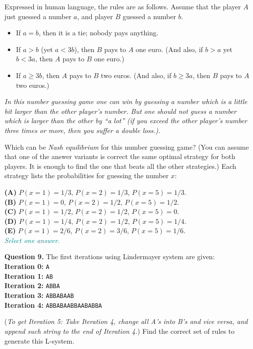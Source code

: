 \documentclass[jou]{apa6}
\begin{document}
Expressed in human language, the rules are as follows. 
Assume that the player $A$ just guessed a number $a$, and player $B$ guessed 
a number $b$. 
\begin{itemize}
\item If $a=b$, then it is a tie; nobody pays anything.
\item If $a>b$ (yet $a < 3b$), then $B$ pays to $A$ one euro. (And also, 
if $b>a$ yet $b < 3a$, then $A$ pays to $B$ one euro.)
\item If $a \geq 3b$, then $A$ pays to $B$ two euros. (And also, if $b \geq 3a$, 
then $B$ pays to $A$ two euros.)
\end{itemize}

{\em In this number guessing game one can win by guessing a number which is a little
bit larger than the other player's number. But one should not guess a number which is 
larger than the other by ``a lot'' (if you exceed the other player's number
three times or more, then you suffer a double loss.).}

Which can be {\em Nash equilibrium} for this number guessing game?
(You can assume that one of the answer variants is correct \textendash{} 
the same optimal strategy for both players. It is enough to find the 
one that beats all the other strategies.) 
Each strategy lists the probabilities for guessing the number $x$: 

{\bf (A)} $P(x = 1) = 1/3$, $P(x = 2) = 1/3$, $P(x = 5) = 1/3$.\\
{\bf (B)} $P(x = 1) = 0$, $P(x = 2) = 1/2$, $P(x = 5) = 1/2$.\\
{\bf (C)} $P(x = 1) = 1/2$, $P(x = 2) = 1/2$, $P(x = 5) = 0$.\\
{\bf (D)} $P(x = 1) = 1/4$, $P(x = 2) = 1/2$, $P(x = 5) = 1/4$.\\
{\bf (E)} $P(x = 1) = 2/6$, $P(x = 2) = 3/6$, $P(x = 5) = 1/6$.\\
\textcolor{teal}{\em Select one answer.}


\vspace{10pt}
{\bf Question 9.} The first iterations using Lindermayer system are given:\\
{\bf Iteration 0:} {\tt A}\\
{\bf Iteration 1:} {\tt AB}\\
{\bf Iteration 2:} {\tt ABBA}\\
{\bf Iteration 3:} {\tt ABBABAAB}\\
{\bf Iteration 4:} {\tt ABBABAABBAABABBA}

({\em To get Iteration 5: Take Iteration 4, 
change all A's into B's and
vice versa, and append such string to the end of Iteration 4.})
Find the correct set of rules to generate this L-system. 
\end{document}

